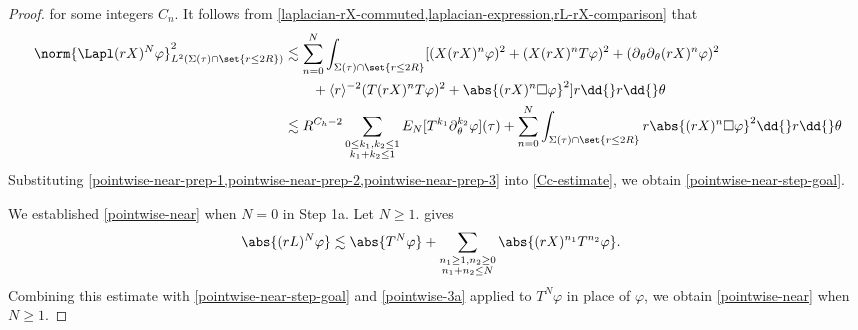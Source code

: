\documentclass[10pt, reqno]{amsart}
\begin{document}
\begin{proof}
for some integers \(C_n\). It follows from
\cref{laplacian-rX-commuted,laplacian-expression,rL-rX-comparison} that
\begin{equation}\label{pointwise-near-prep-3}
\begin{split}
\norm{\Lapl (rX)^N\varphi{}}_{L^2(\Sigma{}(\tau{})\cap \set{r\le 2R})}^2 &\lesssim \sum_{n=0}^N\int _{\Sigma{}(\tau{})\cap \set{r\le 2R}} [(X(rX)^n\varphi{})^2 + (X(rX)^nT\varphi{})^2 + (\partial{}_\theta{}\partial{}_\theta{}(rX)^n\varphi{})^2 \\
&\qquad + \langle{}r\rangle{}^{-2}(T(rX)^nT\varphi{})^2 + \abs{(rX)^n\Box{}\varphi{}}^2]r\dd{}r\dd{}\theta{} \\
&\lesssim R^{C_h-2}\sum_{\substack{0\le k_1,k_2\le 1 \\ k_1+k_2\le 1 }}E_N[T^{k_1}\partial{}_\theta^{k_2}\varphi{}](\tau{}) + \sum_{n=0}^N\int _{\Sigma{}(\tau{})\cap \set{r\le 2R}} r\abs{(rX)^n\Box{}\varphi{}}^2\dd{}r\dd{}\theta{} \\
\end{split}
\end{equation}
Substituting
\cref{pointwise-near-prep-1,pointwise-near-prep-2,pointwise-near-prep-3} into
\cref{Cc-estimate}, we obtain \cref{pointwise-near-step-goal}.

 We established \cref{pointwise-near} when \(N = 0\)
in Step 1a. Let \(N\ge 1\).  gives
\begin{equation}
\begin{split}
\abs{(rL)^N\varphi{}} &\lesssim \abs{T^N\varphi{}} +  \sum_{\substack{n_1\ge 1,n_2\ge 0 \\ n_1+n_2\le N}} \abs{(rX)^{n_1}T^{n_2}\varphi{}}.
\end{split}
\end{equation}
Combining this estimate with \cref{pointwise-near-step-goal} and \cref{pointwise-3a} applied to \(T^N\varphi{}\) in place of
\(\varphi{}\), we obtain \cref{pointwise-near} when \(N\ge 1\).


\end{proof}
\end{document}
